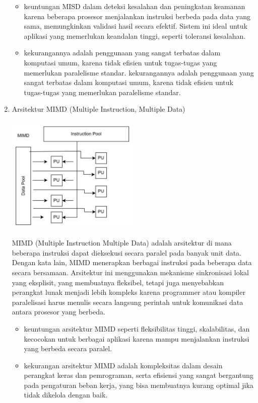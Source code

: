 \documentclass[12pt]{article}
\begin{document}
\begin{enumerate}
    \begin{itemize}
        \item keuntungan MISD dalam deteksi kesalahan dan peningkatan keamanan karena beberapa prosesor menjalankan instruksi berbeda pada data yang sama, memungkinkan validasi hasil secara efektif. Sistem ini ideal untuk aplikasi yang memerlukan keandalan tinggi, seperti toleransi kesalahan.
        \item kekurangannya adalah penggunaan yang sangat terbatas dalam komputasi umum, karena tidak efisien untuk tugas-tugas yang memerlukan paralelisme standar. kekurangannya adalah penggunaan yang sangat terbatas dalam komputasi umum, karena tidak efisien untuk tugas-tugas yang memerlukan paralelisme standar. 
    \end{itemize}
    \item Arsitektur MIMD (Multiple Instruction, Multiple Data)

        \noindent
        \begin{minipage}{\linewidth}
            \centering
            \includegraphics[width=0.5\textwidth]{asset/image9.png} 
        \end{minipage}
        
    MIMD (Multiple Instruction Multiple Data) adalah arsitektur di mana beberapa instruksi dapat dieksekusi secara paralel pada banyak unit data. Dengan kata lain, MIMD menerapkan berbagai instruksi pada beberapa data secara bersamaan. Arsitektur ini menggunakan mekanisme sinkronisasi lokal yang eksplisit, yang membuatnya fleksibel, tetapi juga menyebabkan perangkat lunak menjadi lebih kompleks karena programmer atau kompiler paralelisasi harus menulis secara langsung perintah untuk komunikasi data antara prosesor yang berbeda.

    \begin{itemize}
    
        \item keuntungan arsitektur MIMD seperti fleksibilitas tinggi, skalabilitas, dan kecocokan untuk berbagai aplikasi karena mampu menjalankan instruksi yang berbeda secara paralel.

        \item kekurangan arsitektur MIMD adalah kompleksitas dalam desain perangkat keras dan pemrograman, serta efisiensi yang sangat bergantung pada pengaturan beban kerja, yang bisa membuatnya kurang optimal jika tidak dikelola dengan baik.
    \end{itemize}
\end{enumerate}
\end{document}
